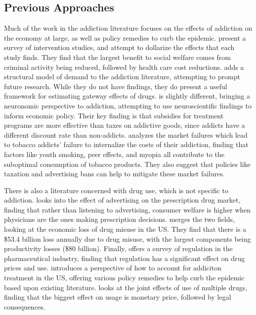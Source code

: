 \documentclass[11pt,a4paper]{article}
\begin{document}

\subsection{Previous Approaches}
\label{subsec:previous_approaches}

Much of the work in the addiction literature focuses on the effects of addiction on the economy at large, as well as policy remedies to curb the epidemic. \cite{mccollister_relative_2003} present a survey of intervention studies, and attempt to dollarize the effects that each study finds. They find that the largest benefit to social welfare comes from criminal activity being reduced, followed by health care cost reductions. \cite{kenkel_economics_2001} adds a structural model of demand to the addiction literature, attempting to prompt future research. While they do not have findings, they do present a useful framework for estimating gateway effects of drugs. \cite{bernheim_neuroscience_2005} is slightly different, bringing a neuronomic perspective to addiction, attempting to use neuroscientific findings to inform economic policy. Their key finding is that subsidies for treatment programs are more effective than taxes on addictive goods, since addicts have a different discount rate than non-addicts. \cite{laux_addiction_2000} analyzes the market failures which lead to tobacco addicts' failure to internalize the costs of their addiction, finding that factors like youth smoking, peer effects, and myopia all contribute to the suboptimal consumption of tobacco products. They also suggest that policies like taxation and advertising bans can help to mitigate these market failures.

There is also a literature concerned with drug use, which is not specific to addiction. \cite{leffler_persuasion_1981} looks into the effect of advertising on the prescription drug market, finding that rather than listening to advertising, consumer welfare is higher when physicians are the ones making prescription decisions. \cite{hansen_economic_2011} merges the two fields, looking at the economic loss of drug misuse in the US. They find that there is a \$53.4 billion loss annually due to drug misuse, with the largest components being productivity losses (\$80 billion). Finally, \cite{temin_regulation_1980} offers a survey of regulation in the pharmaceutical industry, finding that regulation has a significant effect on drug prices and use. \cite{cartwright_critical_2008} introduces a perspective of how to account for addiciton treatment in the US, offering various policy remedies to help curb the epidemic based upon existing literature. \cite{goodman_economic_2009} looks at the joint effects of use of multiple drugs, finding that the biggest effect on usage is monetary price, followed by legal consequences.
\end{document}
